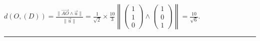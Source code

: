 \documentclass[11pt,a4paper]{article}
\newcommand{\fincorrection}{\vspace{1mm}\hrule\vspace*{7mm}}
\begin{document}
\begin{center}
$d(O,(D))=\frac{\|\overrightarrow{AO}\wedge\overrightarrow{u}\|}{\|\overrightarrow{u}\|}=\frac{1}{\sqrt{2}}\times\frac{10}{3}\left\|
\left(
\begin{array}{c}
1\\
1\\
0
\end{array}
\right)\wedge\left(
\begin{array}{c}
1\\
0\\
1
\end{array}
\right)\right\|=\frac{10}{\sqrt{6}}
$.
\end{center}
\begin{center}
\end{center}
\fincorrection
\end{document}
